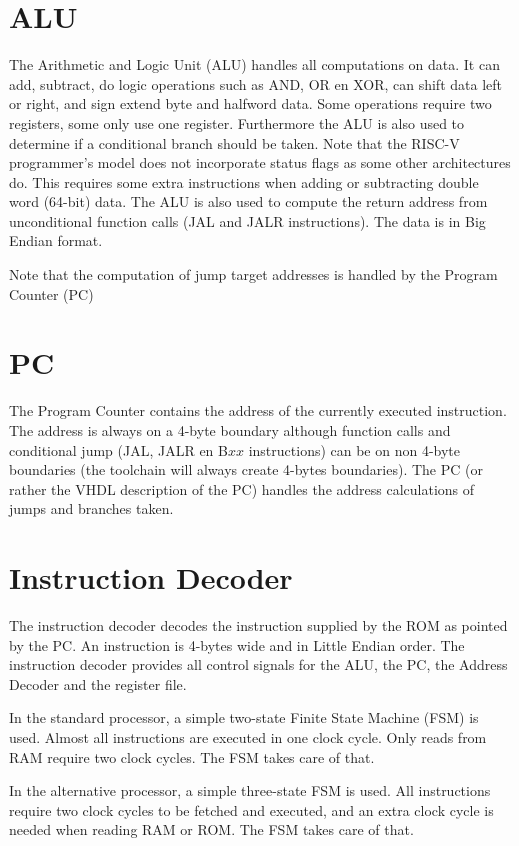 \documentclass[12pt]{article}
\begin{document}
\section{ALU}
\label{sec:alu}
The Arithmetic and Logic Unit (ALU) handles all computations on data. It can add, subtract, do logic operations such as AND, OR en XOR, can shift data left or right, and sign extend byte and halfword data. Some operations require two registers, some only use one register. Furthermore the ALU is also used to determine if a conditional branch should be taken. Note that the RISC-V programmer's model does not incorporate status flags as some other architectures do. This requires some extra instructions when adding or subtracting double word (64-bit) data. The ALU is also used to compute the return address from unconditional function calls (JAL and JALR instructions). The data is in Big Endian format.

Note that the computation of jump target addresses is handled by the Program Counter (PC)

\section{PC}
\label{sec:pc}
The Program Counter contains the address of the currently executed instruction. The address is always on a 4-byte boundary although function calls and conditional jump (JAL, JALR en B$xx$ instructions) can be on non 4-byte boundaries (the toolchain will always create 4-bytes boundaries). The PC (or rather the VHDL description of the PC) handles the address calculations of jumps and branches taken.

\section{Instruction Decoder}
\label{sec:instructiondecoder}
The instruction decoder decodes the instruction supplied by the ROM as pointed by the PC. An instruction is 4-bytes wide and in Little Endian order. The instruction decoder provides all control signals for the ALU, the PC, the Address Decoder and the register file.

In the standard processor, a simple two-state Finite State Machine (FSM) is used. Almost all instructions are executed in one clock cycle. Only reads from RAM require two clock cycles. The FSM takes care of that.

In the alternative processor, a simple three-state FSM is used. All instructions require two clock cycles to be fetched and executed, and an extra clock cycle is needed when reading RAM or ROM. The FSM takes care of that.
\end{document}
